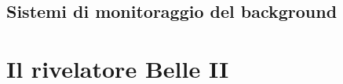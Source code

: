 \documentclass[10pt,a4paper,twoside]{report}
\begin{document}
\subsection{Sistemi di monitoraggio del background}

\begin{comment}
Il background è una delle principali problematiche di un rivelatore, sia per le misure di precisione di fisica, sia per le performance dei vari strati rivelatori di cui è formato Belle II.
A tal ragione, vengono utilizzati diversi rivelatori per poter avere misure della dose di radiazione sia sul rivelatore che su zone delicate dell'acceleratore, per poter intervenire quanto prima in caso di livelli troppo elevati. Grandi dosi di radiazione infatti, posso causare danni accidentali sul rivelatore, diminuendone le performance.??????????????????????
Tra i principali (?) ci sono:

\begin{itemize}
\item Detector di diamante (chiamati ''Diamanti'') che monitorano il rate della dose di radiazione nella zona d'interazione della beam pipe. Questi rientrano anche nel ''fast beam abort system'', cioè un sistema di controllo che considera dati di diversi detector per poter valutare lo ''spegnimento'' dei fasci, per evitare che situazioni fuori controllo arrechino danni a tutta la struttura.
\item il CLAWS (sCintillation Light And Waveform Sensors), formato da scintillatori di materiale plastico e fotomoltiplicatori di silicio, usato per monitorare il background di Belle II in corrispondenza dell'iniezione del fascio (nell'anello principale). Con i diamanti fa parte della logica del sistema di aborto del fascio.
\item TPC's (Time Projection Chambers) che fornisce misure sulla direzione del flusso dei neutroni nel tunnel che ospita l'acceleratore.
\item Tubi di $He^{3}$ per il conteggio dei neutroni termici (con energie cinetiche inferiori a 1/10 di eV, generalmente intorno a 0.025 eV) intorno al rivelatore Belle II.
\end{itemize}

\end{comment}
\section{Il rivelatore Belle II}
\end{document}
